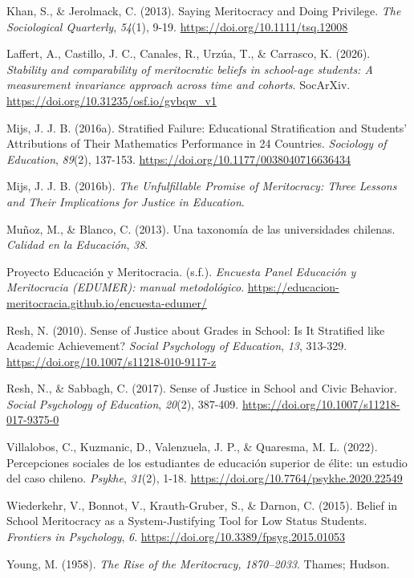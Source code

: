 \documentclass[
  spanish,
  a4paper,
  oneside]{scrbook}
\newlength{\cslhangindent}
\newenvironment{CSLReferences}[2] %
 {\begin{list}{}{%
  \setlength{\itemindent}{0pt}
  \setlength{\leftmargin}{0pt}
  \setlength{\parsep}{0pt}
  \ifodd #1
   \setlength{\leftmargin}{\cslhangindent}
   \setlength{\itemindent}{-1\cslhangindent}
  \fi
  \setlength{\itemsep}{#2\baselineskip}}}
 {\end{list}}
\begin{document}
\begin{CSLReferences}{1}{0}
Khan, S., \& Jerolmack, C. (2013). Saying Meritocracy and Doing
Privilege. \emph{The Sociological Quarterly}, \emph{54}(1), 9-19.
\url{https://doi.org/10.1111/tsq.12008}

Laffert, A., Castillo, J. C., Canales, R., Urzúa, T., \& Carrasco, K.
(2026). \emph{Stability and comparability of meritocratic beliefs in
school-age students: A measurement invariance approach across time and
cohorts}. SocArXiv. \url{https://doi.org/10.31235/osf.io/gvbqw_v1}

Mijs, J. J. B. (2016a). Stratified Failure: {Educational} Stratification
and Students' Attributions of Their Mathematics Performance in 24
Countries. \emph{Sociology of Education}, \emph{89}(2), 137-153.
\url{https://doi.org/10.1177/0038040716636434}

Mijs, J. J. B. (2016b). \emph{The Unfulfillable Promise of Meritocracy:
Three Lessons and Their Implications for Justice in Education}.

Muñoz, M., \& Blanco, C. (2013). Una taxonomía de las universidades
chilenas. \emph{Calidad en la Educación}, \emph{38}.

Proyecto Educación y Meritocracia. (s.f.). \emph{Encuesta Panel
Educación y Meritocracia (EDUMER): manual metodológico}.
\url{https://educacion-meritocracia.github.io/encuesta-edumer/}

Resh, N. (2010). Sense of Justice about Grades in School: Is It
Stratified like Academic Achievement? \emph{Social Psychology of
Education}, \emph{13}, 313-329.
\url{https://doi.org/10.1007/s11218-010-9117-z}

Resh, N., \& Sabbagh, C. (2017). Sense of Justice in School and Civic
Behavior. \emph{Social Psychology of Education}, \emph{20}(2), 387-409.
\url{https://doi.org/10.1007/s11218-017-9375-0}

Villalobos, C., Kuzmanic, D., Valenzuela, J. P., \& Quaresma, M. L.
(2022). Percepciones sociales de los estudiantes de educación superior
de élite: un estudio del caso chileno. \emph{Psykhe}, \emph{31}(2),
1-18. \url{https://doi.org/10.7764/psykhe.2020.22549}

Wiederkehr, V., Bonnot, V., Krauth-Gruber, S., \& Darnon, C. (2015).
Belief in School Meritocracy as a System-Justifying Tool for Low Status
Students. \emph{Frontiers in Psychology}, \emph{6}.
\url{https://doi.org/10.3389/fpsyg.2015.01053}

Young, M. (1958). \emph{The Rise of the Meritocracy, 1870--2033}.
Thames; Hudson.

\end{CSLReferences}
\end{document}
